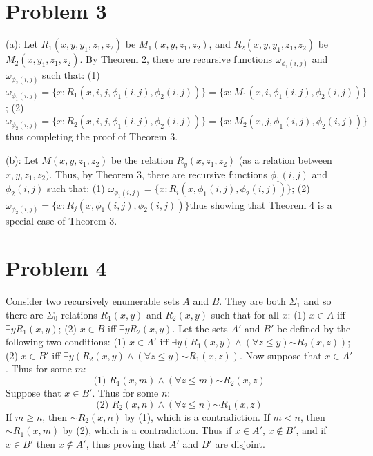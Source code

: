 \documentclass{article}
\newcommand*{\oldneg}{\mathord{\sim}}
\theoremstyle{definition}
\begin{document}
\section*{Problem 3}
(a): Let $R_1(x,y,y_1,z_1,z_2)$ be $M_1(x,y,z_1,z_2)$, and $R_2(x,y,y_1,z_1,z_2)$ be $M_2(x,y_1,z_1,z_2)$. By Theorem 2, there are recursive functions
$\omega_{\phi_1(i,j)}$ and $\omega_{\phi_2(i,j)}$ such that:\newline
(1) $\omega_{\phi_1(i,j)}=\{x:R_1(x,i,j,\phi_1(i,j),\phi_2(i,j))\}=\{x:M_1(x,i,\phi_1(i,j),\phi_2(i,j))\}$;\newline
(2) $\omega_{\phi_2(i,j)}=\{x:R_2(x,i,j,\phi_1(i,j),\phi_2(i,j))\}=\{x:M_2(x,j,\phi_1(i,j),\phi_2(i,j))\}$\newline thus completing the proof of Theorem 3.


(b): Let $M(x,y,z_1,z_2)$ be the relation $R_y(x,z_1,z_2)$ (as a relation between $x,y,z_1,z_2)$. 
Thus, by Theorem 3, there are recursive functions $\phi_1(i,j)$ and $\phi_2(i,j)$ such that:\newline
(1) $\omega_{\phi_1(i,j)}=\{x:R_i(x,\phi_1(i,j),\phi_2(i,j))\}$;\newline
(2) $\omega_{\phi_2(i,j)}=\{x:R_j(x,\phi_1(i,j),\phi_2(i,j))\}$\newline thus showing that Theorem 4 is a special case of Theorem 3.

\section*{Problem 4}
Consider two recursively enumerable sets $A$ and $B$. They are both $\Sigma_1$ and so there are $\Sigma_0$ relations $R_1(x,y)$ and $R_2(x,y)$ such that 
for all $x$:\newline
(1) $x\in A$ iff $\exists yR_1(x,y)$;\newline
(2) $x\in B$ iff $\exists yR_2(x,y)$.\newline
Let the sets $A'$ and $B'$ be defined by the following two conditions:\newline
(1) $x\in A'$ iff $\exists y(R_1(x,y)\wedge\left(\forall z\le y\right)\oldneg R_2(x,z))$;\newline
(2) $x\in B'$ iff $\exists y(R_2(x,y)\wedge\left(\forall z\le y\right)\oldneg R_1(x,z))$.\newline
Now suppose that $x\in A'$. Thus for some $m$: 
\[ \textrm{(1) }R_1(x,m)\wedge (\forall z\le m)\oldneg R_2(x,z) \] 
Suppose that $x\in B'$. Thus for some $n$: 
\[ \textrm{(2) }R_2(x,n)\wedge (\forall z\le n)\oldneg R_1(x,z) \] 
If $m\ge n$, then $\oldneg R_2(x,n)$ by (1), which is a contradiction. If $m<n$, then $\oldneg R_1(x,m)$ by (2), which is a contradiction. Thus if 
$x\in A'$, $x\notin B'$, and if $x\in B'$ then $x\notin A'$, 
thus proving that $A'$ and $B'$ are disjoint.
\end{document}
